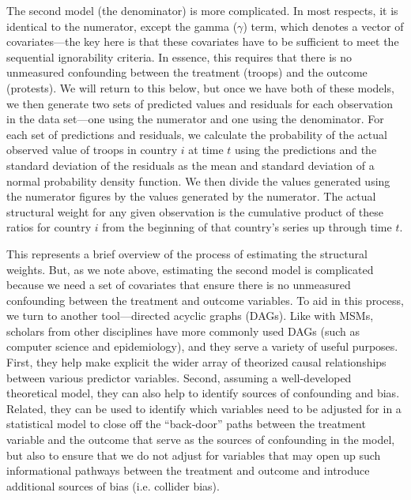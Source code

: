 		The second model (the denominator) is more complicated. In most respects, it is identical to the numerator, except the gamma ($\gamma$) term, which denotes a vector of covariates---the key here is that these covariates have to be sufficient to meet the sequential ignorability criteria. In essence, this requires that there is no unmeasured confounding between the treatment (troops) and the outcome (protests).\cite[The language on this point can be confusing given that these techniques were developed across several different literatures and disciplines and compounded by the fact that they often did not speak to one another. To put it in slightly different terms using language from Pearl, this set of covariates must ensure that Pr$ (Y_{it} \Perp X_{it} | \gamma, Z_{i}) $.][That is, the outcome is conditionally independent of the treatment, conditional upon the time-varying covariates ($\gamma$) and the time-invariant covariates ($Z$).]{Pearl2009} We will return to this below, but once we have both of these models, we then generate two sets of predicted values and residuals for each observation in the data set---one using the numerator and one using the denominator. For each set of predictions and residuals, we calculate the probability of the actual observed value of troops in country $i$ at time $t$ using the predictions and the standard deviation of the residuals as the mean and standard deviation of a normal probability density function. We then divide the values generated using the numerator figures by the values generated by the numerator. The actual structural weight for any given observation is the cumulative product of these ratios for country $i$ from the beginning of that country's series up through time $t$. 
		
		This represents a brief overview of the process of estimating the structural weights. But, as we note above, estimating the second model is complicated because we need a set of covariates that ensure there is no unmeasured confounding between the treatment and outcome variables. To aid in this process, we turn to another tool---directed acyclic graphs (DAGs). Like with MSMs, scholars from other disciplines have more commonly used DAGs (such as computer science and epidemiology), and they serve a variety of useful purposes. First, they help make explicit the wider array of theorized causal relationships between various predictor variables. Second, assuming a well-developed theoretical model, they can also help to identify sources of confounding and bias.\cite[See:][Keele et al. offer a fuller discussion of DAGs and their applications.]{Pearl2009,MorganWinship2015,KeeleStevensonElwert2020} Related, they can be used to identify which variables need to be adjusted for in a statistical model to close off the ``back-door'' paths between the treatment variable and the outcome that serve as the sources of confounding in the model, but also to ensure that we do not adjust for variables that may open up such informational pathways between the treatment and outcome and introduce additional sources of bias (i.e. collider bias).\cite[][we use the {\tt dagitty} package in {\tt R } to build our DAG and to identify possible adjustment sets.]{Pearl2009,Textoretal2016}
		
